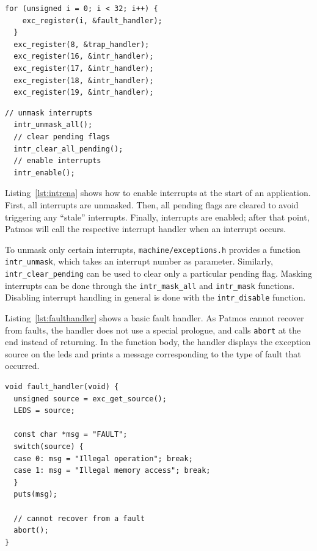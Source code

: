 \documentclass[a4paper,fontsize=10pt,twoside,DIV15,BCOR12mm,headinclude=true,footinclude=false,pagesize,bibtotoc]{scrbook}
\begin{document}
\begin{lstlisting}[float, caption={Exception handler registration\label{lst:excreg}}]
  for (unsigned i = 0; i < 32; i++) {
	exc_register(i, &fault_handler);
  }
  exc_register(8, &trap_handler);
  exc_register(16, &intr_handler);
  exc_register(17, &intr_handler);
  exc_register(18, &intr_handler);
  exc_register(19, &intr_handler);
\end{lstlisting}

\begin{lstlisting}[float, caption={Interrupt enabling\label{lst:intrena}}]
  // unmask interrupts
  intr_unmask_all();
  // clear pending flags
  intr_clear_all_pending();
  // enable interrupts
  intr_enable();
\end{lstlisting}

Listing~\ref{lst:intrena} shows how to enable interrupts at the start
of an application. First, all interrupts are unmasked. Then, all
pending flags are cleared to avoid triggering any ``stale''
interrupts. Finally, interrupts are enabled; after that point, Patmos
will call the respective interrupt handler when an interrupt occurs.

To unmask only certain interrupts, \texttt{machine/exceptions.h}
provides a function \texttt{intr\_unmask}, which takes an interrupt
number as parameter. Similarly, \texttt{intr\_clear\_pending} can be
used to clear only a particular pending flag. Masking interrupts can
be done through the \texttt{intr\_mask\_all} and \texttt{intr\_mask}
functions. Disabling interrupt handling in general is done with the
\texttt{intr\_disable} function.

Listing~\ref{lst:faulthandler} shows a basic fault handler. As Patmos
cannot recover from faults, the handler does not use a special
prologue, and calls \texttt{abort} at the end instead of returning. In
the function body, the handler displays the exception source on the
leds and prints a message corresponding to the type of fault that
occurred.

\begin{lstlisting}[float, caption={Fault handler example\label{lst:faulthandler}}]
void fault_handler(void) {
  unsigned source = exc_get_source();
  LEDS = source;

  const char *msg = "FAULT";
  switch(source) {
  case 0: msg = "Illegal operation"; break;
  case 1: msg = "Illegal memory access"; break;
  }
  puts(msg);

  // cannot recover from a fault
  abort();
}
\end{lstlisting}
\end{document}
